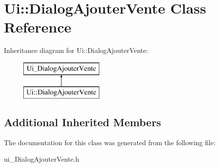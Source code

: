 \section{Ui\-:\-:Dialog\-Ajouter\-Vente Class Reference}
\label{class_ui_1_1_dialog_ajouter_vente}
Inheritance diagram for Ui\-:\-:Dialog\-Ajouter\-Vente\-:\begin{figure}[H]
\begin{center}
\leavevmode
\includegraphics[height=2.000000cm]{class_ui_1_1_dialog_ajouter_vente}
\end{center}
\end{figure}
\subsection*{Additional Inherited Members}


The documentation for this class was generated from the following file\-:\begin{DoxyCompactItemize}
\item 
ui\-\_\-\-Dialog\-Ajouter\-Vente.\-h\end{DoxyCompactItemize}
